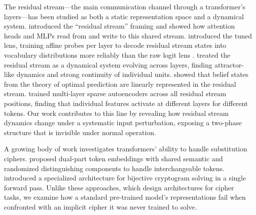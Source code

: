 The residual stream---the main communication channel through a transformer's layers---has been studied as both a static representation space and a dynamical system. \citet{elhage2021mathematical} introduced the ``residual stream'' framing and showed how attention heads and MLPs read from and write to this shared stream. \citet{belrose2023tuned} introduced the tuned lens, training affine probes per layer to decode residual stream states into vocabulary distributions more reliably than the raw logit lens \citep{nostalgebraist2020logitlens}. \citet{fernando2025dynamics} treated the residual stream as a dynamical system evolving across layers, finding attractor-like dynamics and strong continuity of individual units. \citet{shai2024belief} showed that belief states from the theory of optimal prediction are linearly represented in the residual stream. \citet{lawson2024residual} trained multi-layer sparse autoencoders across all residual stream positions, finding that individual features activate at different layers for different tokens. Our work contributes to this line by revealing how residual stream dynamics change under a systematic input perturbation, exposing a two-phase structure that is invisible under normal operation.

A growing body of work investigates transformers' ability to handle substitution ciphers. \citet{isik2024interchangeable} proposed dual-part token embeddings with shared semantic and randomized distinguishing components to handle interchangeable tokens. \citet{alice2025cipher} introduced a specialized architecture for bijective cryptogram solving in a single forward pass. Unlike these approaches, which design architectures for cipher tasks, we examine how a standard pre-trained model's representations fail when confronted with an implicit cipher it was never trained to solve.
